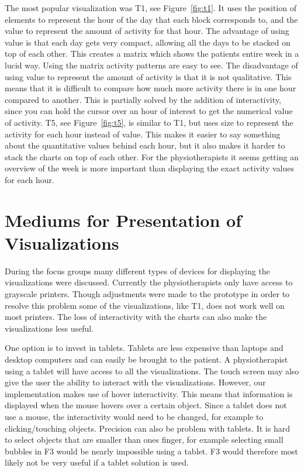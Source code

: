 The most popular visualization was T1, see Figure~\ref{fig:t1}. It uses the position of elements to represent the hour of the day that each block corresponds to, and the value to represent the amount of activity for that hour. The advantage of using value is that each day gets very compact, allowing all the days to be stacked on top of each other. This creates a matrix which shows the patients entire week in a lucid way. Using the matrix activity patterns are easy to see. The disadvantage of using value to represent the amount of activity is that it is not qualitative. This means that it is difficult to compare how much more activity there is in one hour compared to another. This is partially solved by the addition of interactivity, since you can hold the cursor over an hour of interest to get the numerical value of activity. T5, see Figure~\ref{fig:t5}, is similar to T1, but uses size to represent the activity for each hour instead of value. This makes it easier to say something about the quantitative values behind each hour, but it also makes it harder to stack the charts on top of each other. For the physiotherapists it seems getting an overview of the week is more important than displaying the exact activity values for each hour. 



\section{Mediums for Presentation of Visualizations}
During the focus groups many different types of devices for displaying the visualizations were discussed. Currently the physiotherapists only have access to grayscale printers. Though adjustments were made to the prototype in order to resolve this problem some of the visualizations, like T1, does not work well on most printers. The loss of interactivity with the charts can also make the visualizations less useful.

One option is to invest in tablets. Tablets are less expensive than laptops and desktop computers and can easily be brought to the patient. A physiotherapist using a tablet will have access to all the visualizations. The touch screen may also give the user the ability to interact with the visualizations. However, our implementation makes use of hover interactivity. This means that information is displayed when the mouse hovers over a certain object. Since a tablet does not use a mouse, the interactivity would need to be changed, for example to clicking/touching objects. Precision can also be problem with tablets. It is hard to select objects that are smaller than ones finger, for example selecting small bubbles in F3 would be nearly impossible using a tablet. F3 would therefore most likely not be very useful if a tablet solution is used. 

